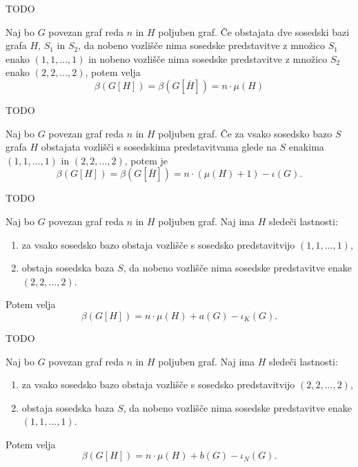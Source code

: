 \documentclass[mat1, tisk]{fmfdelo}
\newcommand{\1}{(1, 1, ..., 1)}
\newcommand{\2}{(2, 2, ..., 2)}
\begin{document}
\begin{dokaz}
    TODO
\end{dokaz}


\begin{trditev}
    Naj bo $G$ povezan graf reda $n$ in $H$ poljuben graf. Če obstajata dve sosedski bazi 
    grafa $H$, $S_1$ in $S_2$, da nobeno vozlišče nima sosedske predstavitve z množico $S_1$ 
    enako $\1$ in nobeno vozlišče nima sosedske predstavitve z množico $S_2$ 
    enako $\2$, potem velja $$\beta(G[H]) = \beta(G[\overline{H}]) = n \cdot \mu(H) $$ 
\end{trditev}

\begin{dokaz}
    TODO
\end{dokaz}


\begin{trditev}
    Naj bo $G$ povezan graf reda $n$ in $H$ poljuben graf. Če za vsako sosedsko bazo $S$
    grafa $H$ obstajata vozlišči s sosedskima predstavitvama glede na $S$ enakima $\1$ in $\2$,
    potem je 
    $$\beta(G[H]) = \beta(G[\overline{H}]) = n \cdot (\mu(H) + 1) - \iota(G). $$
\end{trditev}

\begin{dokaz}
    TODO
\end{dokaz}


\begin{trditev}
    Naj bo $G$ povezan graf reda $n$ in $H$ poljuben graf. Naj ima $H$ sledeči lastnosti:
    \begin{enumerate}
        \item za vsako sosedsko bazo obstaja vozlišče s sosedsko predstavitvijo $\1$,
        \item obstaja sosedska baza $S$, da nobeno vozlišče nima sosedske predstavitve enake $\2.$
    \end{enumerate} 
    Potem velja $$\beta(G[H]) = n \cdot \mu(H) + a(G) - \iota_K(G). $$
\end{trditev}

\begin{dokaz}
    TODO
\end{dokaz}


\begin{trditev}
    Naj bo $G$ povezan graf reda $n$ in $H$ poljuben graf. Naj ima $H$ sledeči lastnosti:
    \begin{enumerate}
        \item za vsako sosedsko bazo obstaja vozlišče s sosedsko predstavitvijo $\2$,
        \item obstaja sosedska baza $S$, da nobeno vozlišče nima sosedske predstavitve enake $\1.$
    \end{enumerate} 
    Potem velja $$\beta(G[H]) = n \cdot \mu(H) + b(G) - \iota_N(G). $$
\end{trditev}
\end{document}
